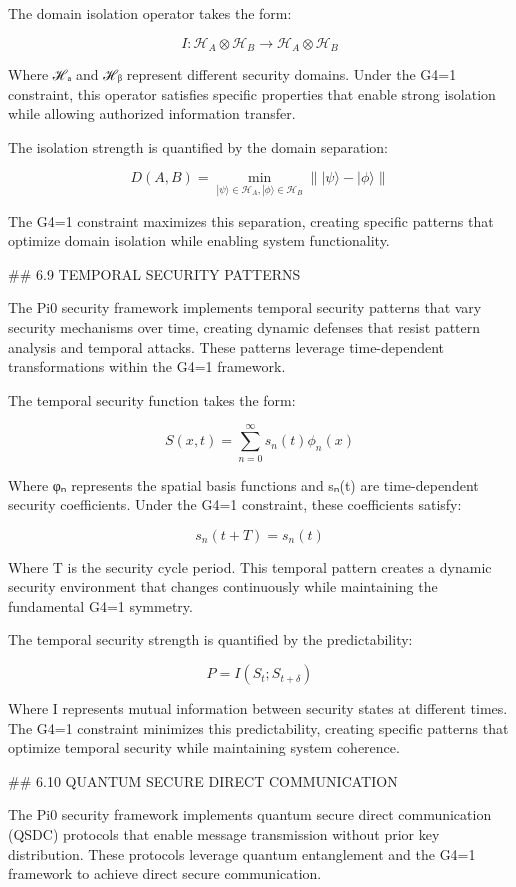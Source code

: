 The domain isolation operator takes the form:

$$I: \mathcal{H}_A \otimes \mathcal{H}_B \rightarrow \mathcal{H}_A \otimes \mathcal{H}_B$$

Where ℋₐ and ℋᵦ represent different security domains. Under the G4=1 constraint, this operator satisfies specific properties that enable strong isolation while allowing authorized information transfer.

The isolation strength is quantified by the domain separation:

$$D(A, B) = \min_{|\psi\rangle \in \mathcal{H}_A, |\phi\rangle \in \mathcal{H}_B} \| |\psi\rangle - |\phi\rangle \|$$

The G4=1 constraint maximizes this separation, creating specific patterns that optimize domain isolation while enabling system functionality.

## 6.9 TEMPORAL SECURITY PATTERNS

The Pi0 security framework implements temporal security patterns that vary security mechanisms over time, creating dynamic defenses that resist pattern analysis and temporal attacks. These patterns leverage time-dependent transformations within the G4=1 framework.

The temporal security function takes the form:

$$S(x, t) = \sum_{n=0}^{\infty} s_n(t) \phi_n(x)$$

Where φₙ represents the spatial basis functions and sₙ(t) are time-dependent security coefficients. Under the G4=1 constraint, these coefficients satisfy:

$$s_n(t+T) = s_n(t)$$

Where T is the security cycle period. This temporal pattern creates a dynamic security environment that changes continuously while maintaining the fundamental G4=1 symmetry.

The temporal security strength is quantified by the predictability:

$$P = I(S_t; S_{t+\delta})$$

Where I represents mutual information between security states at different times. The G4=1 constraint minimizes this predictability, creating specific patterns that optimize temporal security while maintaining system coherence.

## 6.10 QUANTUM SECURE DIRECT COMMUNICATION

The Pi0 security framework implements quantum secure direct communication (QSDC) protocols that enable message transmission without prior key distribution. These protocols leverage quantum entanglement and the G4=1 framework to achieve direct secure communication.

